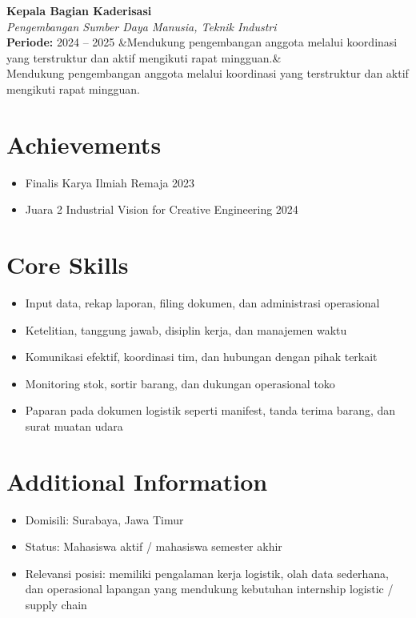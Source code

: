 \documentclass[a4paper,10pt]{article}
\newcommand{\cventry}[4]{%
  \noindent\textbf{#1} \\
  \textit{#2} \\
  \textbf{Periode:} #3
  \ifx&#4& \else \\ \small #4 \fi
  \vspace{6pt}
}
\begin{document}
\cventry
  {Kepala Bagian Kaderisasi}
  {Pengembangan Sumber Daya Manusia, Teknik Industri}
  {2024 -- 2025}
  {Mendukung pengembangan anggota melalui koordinasi yang terstruktur dan aktif mengikuti rapat mingguan.}

\section{Achievements}
\begin{itemize}
  \item Finalis Karya Ilmiah Remaja 2023
  \item Juara 2 Industrial Vision for Creative Engineering 2024
\end{itemize}

\section{Core Skills}
\begin{itemize}
  \item Input data, rekap laporan, filing dokumen, dan administrasi operasional
  \item Ketelitian, tanggung jawab, disiplin kerja, dan manajemen waktu
  \item Komunikasi efektif, koordinasi tim, dan hubungan dengan pihak terkait
  \item Monitoring stok, sortir barang, dan dukungan operasional toko
  \item Paparan pada dokumen logistik seperti manifest, tanda terima barang, dan surat muatan udara
\end{itemize}

\section{Additional Information}
\begin{itemize}
  \item Domisili: Surabaya, Jawa Timur
  \item Status: Mahasiswa aktif / mahasiswa semester akhir
  \item Relevansi posisi: memiliki pengalaman kerja logistik, olah data sederhana, dan operasional lapangan yang mendukung kebutuhan internship logistic / supply chain
\end{itemize}
\end{document}
